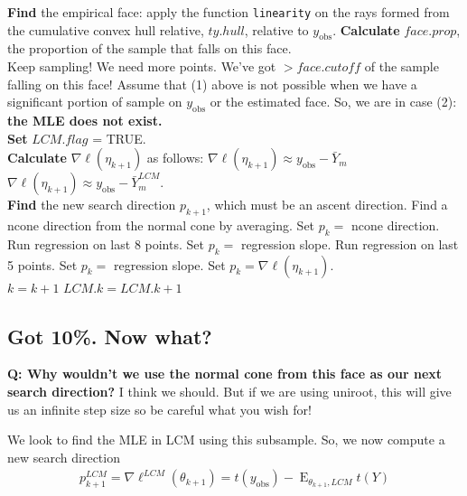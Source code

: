 \documentclass{amsbook}
\DeclareMathOperator{\E}{E}
\newcommand{\yobs}{y_{\textrm{obs}}}
\theoremstyle{definition}
\theoremstyle{remark}
\begin{document}
\begin{algorithmic}
	\State \textbf{Find} the empirical face: apply the function \texttt{linearity} on the rays formed 
	\State from the cumulative convex hull relative, $ty.hull$, relative to $\yobs$.
	\State \textbf{Calculate} $face.prop$, the proportion of the sample that falls on
	\State this face.\\
		\State	Keep sampling!	We need more points.
	\Else
		\State We've got $> face.cutoff$ of the sample falling on this face!
		\State Assume that (1) above is not possible when we have a significant 
		\State portion of sample on $\yobs$ or the estimated face.  
		\State So, we are in case (2):  \textbf{the MLE does not exist.}\\
		\State \textbf{Set} $LCM.flag$ = TRUE.
	\EndIf
\EndIf\\
\State \textbf{Calculate} $\nabla \ell( \eta_{k+1})$ as follows: \label{Calc:nabla}
	\State $\nabla \ell( \eta_{k+1}) \approx \yobs - \bar{Y}_m$
\Else
	\State $\nabla \ell( \eta_{k+1}) \approx \yobs - \bar{Y}_m^{LCM}$.
\EndIf\\

\State \textbf{Find} the new search direction $p_{k+1}$, which must be an ascent direction.
	\State Find a ncone direction from the normal cone by averaging.
	\State Set $p_k = $ ncone direction.
	\State Run regression on last 8 points.
	\State Set $p_k = $ regression slope.
		\State Run regression on last 5 points.
		\State Set $p_k = $ regression slope.
\Else
	\State Set $p_k = \nabla \ell( \eta_{k+1})$.
\EndIf\\

\State $k = k + 1$
	\State $LCM.k = LCM.k + 1$
\EndIf
\EndWhile
\end{algorithmic}

\newpage
\subsection{Got 10\%.  Now what?}

\textbf{Q: Why wouldn't we use the normal cone from this face as our next search 
direction?}
I think we should.  But if we are using uniroot, this will give us an infinite step 
size so be careful what you wish for!

We look to find the MLE in LCM using this subsample.  So, we now compute a new search 
direction
\begin{align*}
	p_{k+1}^{LCM} = \nabla \ell^{LCM}(\theta_{k+1}) = t(\yobs) - \E_{\theta_{k+1}, 
LCM}t(Y)
\end{align*}
\end{document}
